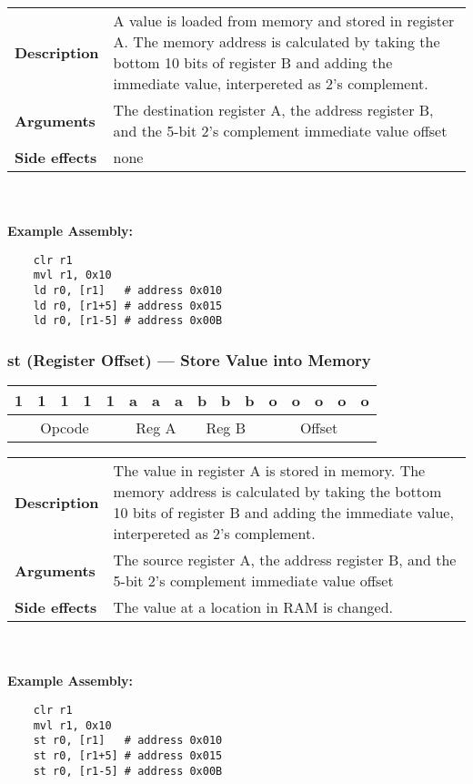 \documentclass[titlepage]{article}
\begin{document}
\begin{tabular}{l p{8cm}}
{\bf Description} & A value is loaded from memory and stored in register A. The memory address is calculated by taking the bottom 10 bits of register B and adding the immediate value, interpereted as 2's complement. \\
{\bf Arguments} & The destination register A, the address register B, and the 5-bit 2's complement immediate value offset \\
{\bf Side effects} & none \\
\end{tabular}\\ \\
{\bf Example Assembly:}
\begin{verbatim}
    clr r1
    mvl r1, 0x10
    ld r0, [r1]   # address 0x010
    ld r0, [r1+5] # address 0x015
    ld r0, [r1-5] # address 0x00B
\end{verbatim}

\subsubsection{st (Register Offset) --- Store Value into Memory}\begin{center}
\begin{tabular}{|c|c|c|c|c|c|c|c|c|c|c|c|c|c|c|c|}
\hline
1 & 1 & 1 & 1 & 1 & a & a & a & b & b & b & o & o & o & o & o \\
\hline
\multicolumn{5}{|c}{Opcode} &
\multicolumn{3}{|c}{Reg A} &
\multicolumn{3}{|c}{Reg B} &
\multicolumn{5}{|c|}{Offset} \\
\hline
\end{tabular}
\end{center}

\begin{tabular}{l p{8cm}}
{\bf Description} & The value in register A is stored in memory. The memory address is calculated by taking the bottom 10 bits of register B and adding the immediate value, interpereted as 2's complement. \\
{\bf Arguments} & The source register A, the address register B, and the 5-bit 2's complement immediate value offset \\
{\bf Side effects} & The value at a location in RAM is changed. \\
\end{tabular}\\ \\
{\bf Example Assembly:}
\begin{verbatim}
    clr r1
    mvl r1, 0x10
    st r0, [r1]   # address 0x010
    st r0, [r1+5] # address 0x015
    st r0, [r1-5] # address 0x00B
\end{verbatim}
\end{document}
